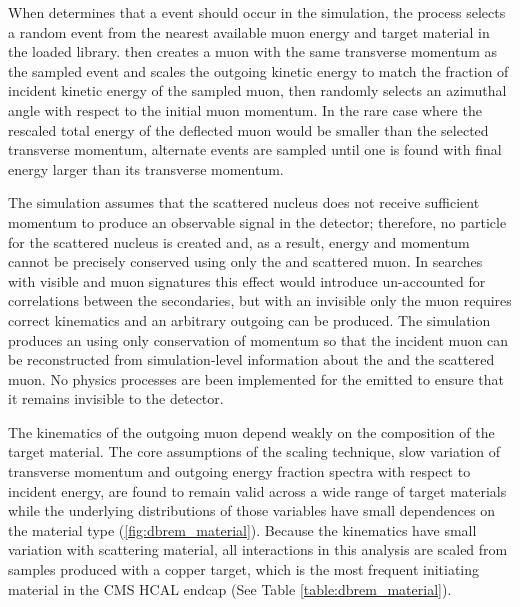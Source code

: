 When \gf determines that a \dbrem event should occur in the simulation, the process selects a random event from the nearest available muon energy and target material in the loaded \mg library. 
\gf then creates a muon with the same transverse momentum as the sampled event and scales the outgoing kinetic energy to match the fraction of incident kinetic energy of the sampled muon, then randomly selects an azimuthal angle with respect to the initial muon momentum. 
In the rare case where the rescaled total energy of the deflected muon would be smaller than the selected transverse momentum, alternate events are sampled until one is found with final energy larger than its transverse momentum. 

The simulation assumes that the scattered nucleus does not receive sufficient momentum to produce an observable signal in the detector; therefore, no \gf particle for the scattered nucleus is created and, as a result, energy and momentum cannot be precisely conserved using only the \aprime and scattered muon. 
In searches with visible \aprime and muon signatures this effect would introduce un-accounted for correlations between the secondaries, but with an invisible \aprime only the muon requires correct kinematics and an arbitrary outgoing \aprime can be produced.  
The simulation produces an \aprime using only conservation of momentum so that the incident muon can be reconstructed from simulation-level information about the \aprime and the scattered muon.
No physics processes are been implemented for the emitted \aprime to ensure that it remains invisible to the detector.

The kinematics of the outgoing muon depend weakly on the composition of the target material.
The core assumptions of the scaling technique, slow variation of transverse momentum and outgoing energy fraction spectra with respect to incident energy, are found to remain valid across a wide range of target materials while the underlying distributions of those variables have small dependences on the material type (\cref{fig:dbrem_material}).
Because the kinematics have small variation with scattering material, all \dbrem interactions in this analysis are scaled from samples produced with a copper target, which is the most frequent \dbrem initiating material in the CMS HCAL endcap (See Table \ref{table:dbrem_material}).   

